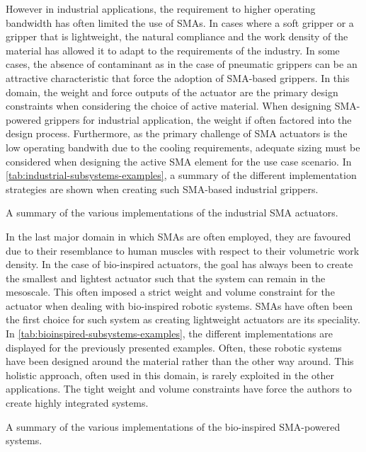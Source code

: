 However in industrial applications, the requirement to higher operating bandwidth has often limited the use of SMAs. In cases where a soft gripper or a gripper that is lightweight, the natural compliance and the work density of the material has allowed it to adapt to the requirements of the industry. In some cases, the absence of contaminant as in the case of pneumatic grippers can be an attractive characteristic that force the adoption of SMA-based grippers. In this domain, the weight and force outputs of the actuator are the primary design constraints when considering the choice of active material. When designing SMA-powered grippers for industrial application, the weight if often factored into the design process. Furthermore, as the primary challenge of SMA actuators is the low operating bandwith due to the cooling requirements, adequate sizing must be considered when designing the active SMA element for the use case scenario. In \cref{tab:industrial-subsystems-examples}, a summary of the different implementation strategies are shown when creating such SMA-based industrial grippers.

\begin{table}[hbt]
    \centering
    \caption{A summary of the various implementations of the industrial SMA actuators.}
    
    \label{tab:industrial-subsystems-examples}
\end{table}

In the last major domain in which SMAs are often employed, they are favoured due to their resemblance to human muscles with respect to their volumetric work density. In the case of bio-inspired actuators, the goal has always been to create the smallest and lightest actuator such that the system can remain in the mesoscale. This often imposed a strict weight and volume constraint for the actuator when dealing with bio-inspired robotic systems. SMAs have often been the first choice for such system as creating lightweight actuators are its speciality. In \cref{tab:bioinspired-subsystems-examples}, the different implementations are displayed for the previously presented examples. Often, these robotic systems have been designed around the material rather than the other way around. This holistic approach, often used in this domain, is rarely exploited in the other applications. The tight weight and volume constraints have force the authors to create highly integrated systems.

\begin{table}[hbt]
    \centering
    \caption{A summary of the various implementations of the bio-inspired SMA-powered systems.}
    
    \label{tab:bioinspired-subsystems-examples}
\end{table}

